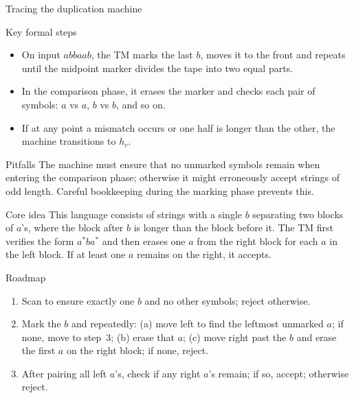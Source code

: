 \begin{frame}[t]{Tracing the duplication machine}
  \begin{tblock}{Key formal steps}
    \begin{itemize}
      \item On input $abbaab$, the TM marks the last $b$, moves it to
        the front and repeats until the midpoint marker divides the
        tape into two equal parts.
      \item In the comparison phase, it erases the marker and checks
        each pair of symbols: $a$ vs $a$, $b$ vs $b$, and so on.
      \item If at any point a mismatch occurs or one half is longer
        than the other, the machine transitions to $h_r$.
    \end{itemize}
  \end{tblock}
  \begin{talert}{Pitfalls}
    The machine must ensure that no unmarked symbols remain when
    entering the comparison phase; otherwise it might erroneously
    accept strings of odd length.  Careful bookkeeping during the
    marking phase prevents this.
  \end{talert}
  \label{fr:7.2-07}
\end{frame}

\begin{frame}[t]{}
  \begin{tblock}{Core idea}
    This language consists of strings with a single $b$ separating two
    blocks of $a$’s, where the block after $b$ is longer than the block
    before it.  The TM first verifies the form $a^* b a^*$ and then
    erases one $a$ from the right block for each $a$ in the left block.
    If at least one $a$ remains on the right, it accepts.
  \end{tblock}
  \begin{tblock}{Roadmap}
    \begin{enumerate}
      \item Scan to ensure exactly one $b$ and no other symbols; reject
        otherwise.
      \item Mark the $b$ and repeatedly: (a) move left to find the
        leftmost unmarked $a$; if none, move to step 3; (b) erase that
        $a$; (c) move right past the $b$ and erase the first $a$ on the
        right block; if none, reject.
      \item After pairing all left $a$’s, check if any right $a$’s
        remain; if so, accept; otherwise reject.
    \end{enumerate}
  \end{tblock}
  \label{fr:7.2-08}
\end{frame}


